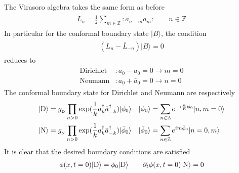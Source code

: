 The Virasoro algebra takes the same form as before
\begin{eqnarray}\begin{aligned}
L_n=\frac{1}{2}\sum_{m\in\mathbb{Z}}:a_{n-m}a_m:\qquad n\in\mathbb{Z}
\end{aligned}\end{eqnarray}
In particular for the conformal boundary state $|B\rangle$, the condition
\begin{eqnarray}\begin{aligned}
(L_n-\bar{L}_{-n})|B\rangle=0
\end{aligned}\end{eqnarray}
reduces to 
\begin{eqnarray}\begin{aligned}
\label{eq:DN_a}
\text{Dirichlet}&:a_0-\bar{a}_0=0\rightarrow m=0 \\
\text{Neumann}&:a_0+\bar{a}_0=0\rightarrow n=0
\end{aligned}\end{eqnarray}
The conformal boundary state for Dirichlet and Neumann are respectively
\begin{eqnarray}\begin{aligned}
\label{eq:DN_state}
|{\rm D} \rangle  &= g_{\,\!_\text{D}}  \prod_{n > 0 } \exp(\frac{1}{k} a_k^{\dagger} \bar{a}_{-k}^{\dagger} )| \phi_0 \rangle \quad | \phi_0 \rangle = \sum_{n \in \mathbb{Z}} e^{-i \frac{n}{R}\phi_0 } | n, m = 0 \rangle \\
| {\rm N} \rangle &= g_{\,\!_\text{N}} \prod_{n > 0 } \exp(\frac{1}{k} a_k^{\dagger} \bar{a}_{-k}^{\dagger} )| \bar{\phi}_0 \rangle \quad | \bar{\phi}_0 \rangle = \sum_{n \in \mathbb{Z}} e^{i m \bar{\phi}_0 } | n = 0, m \rangle 
\end{aligned}\end{eqnarray}
It is clear that the desired boundary conditions are satisfied
\begin{eqnarray}\begin{aligned}
\phi(x,t=0)|{\rm D} \rangle=\phi_0|{\rm D} \rangle\qquad \partial_t \phi( x, t = 0 ) | {\rm N } \rangle = 0
\end{aligned}\end{eqnarray}

